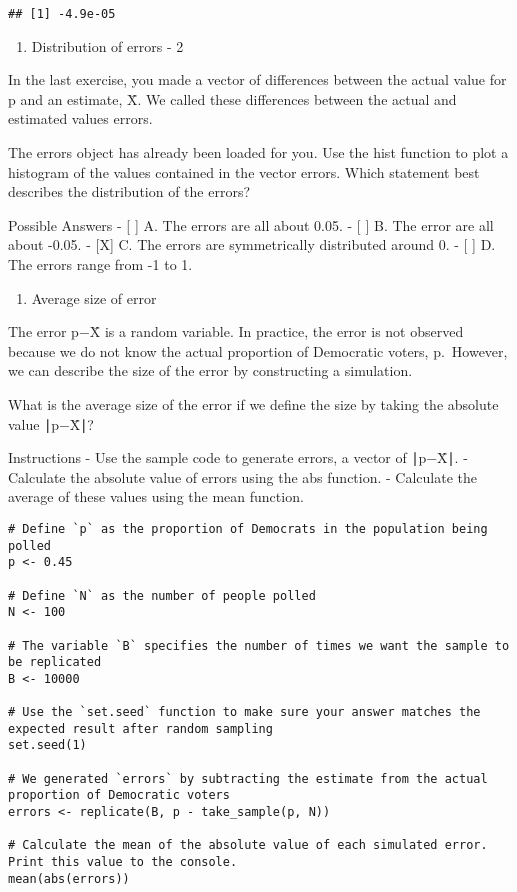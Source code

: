\documentclass[
]{article}
\providecommand{\tightlist}{%
  \setlength{\itemsep}{0pt}\setlength{\parskip}{0pt}}
\begin{document}
\begin{verbatim}
## [1] -4.9e-05
\end{verbatim}

\begin{enumerate}
\def\labelenumi{\arabic{enumi}.}
\setcounter{enumi}{2}
\tightlist
\item
  Distribution of errors - 2
\end{enumerate}

In the last exercise, you made a vector of differences between the
actual value for p and an estimate, X̄. We called these differences
between the actual and estimated values errors.

The errors object has already been loaded for you. Use the hist function
to plot a histogram of the values contained in the vector errors. Which
statement best describes the distribution of the errors?

Possible Answers - {[} {]} A. The errors are all about 0.05. - {[} {]}
B. The error are all about -0.05. - {[}X{]} C. The errors are
symmetrically distributed around 0. - {[} {]} D. The errors range from
-1 to 1.

\begin{enumerate}
\def\labelenumi{\arabic{enumi}.}
\setcounter{enumi}{3}
\tightlist
\item
  Average size of error
\end{enumerate}

The error p−X̄ is a random variable. In practice, the error is not
observed because we do not know the actual proportion of Democratic
voters, p.~However, we can describe the size of the error by
constructing a simulation.

What is the average size of the error if we define the size by taking
the absolute value ∣p−X̄∣?

Instructions - Use the sample code to generate errors, a vector of
∣p−X̄∣. - Calculate the absolute value of errors using the abs function.
- Calculate the average of these values using the mean function.

\begin{verbatim}
# Define `p` as the proportion of Democrats in the population being polled
p <- 0.45

# Define `N` as the number of people polled
N <- 100

# The variable `B` specifies the number of times we want the sample to be replicated
B <- 10000

# Use the `set.seed` function to make sure your answer matches the expected result after random sampling
set.seed(1)

# We generated `errors` by subtracting the estimate from the actual proportion of Democratic voters
errors <- replicate(B, p - take_sample(p, N))

# Calculate the mean of the absolute value of each simulated error. Print this value to the console.
mean(abs(errors))
\end{verbatim}
\end{document}
